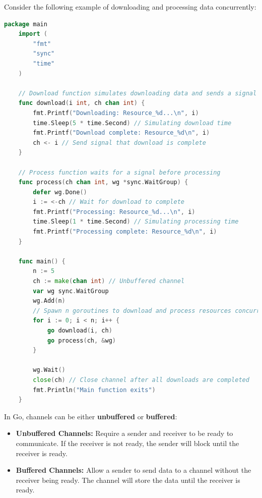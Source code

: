 \begin{Example}

    \label{ex:channels}
Consider the following example of downloading and processing data concurrently:
\begin{lstlisting}[language=Go, caption=Using Channels to Synchronize Downloading and Processing, label={lst:channels}, numbers=none]
    package main
    import (
        "fmt"
        "sync"
        "time"
    )

    // Download function simulates downloading data and sends a signal when done
    func download(i int, ch chan int) {
        fmt.Printf("Downloading: Resource_%d...\n", i)
        time.Sleep(5 * time.Second) // Simulating download time
        fmt.Printf("Download complete: Resource_%d\n", i)
        ch <- i // Send signal that download is complete
    }

    // Process function waits for a signal before processing
    func process(ch chan int, wg *sync.WaitGroup) {
        defer wg.Done()
        i := <-ch // Wait for download to complete
        fmt.Printf("Processing: Resource_%d...\n", i)
        time.Sleep(1 * time.Second) // Simulating processing time
        fmt.Printf("Processing complete: Resource_%d\n", i)
    }

    func main() {
        n := 5
        ch := make(chan int) // Unbuffered channel
        var wg sync.WaitGroup
        wg.Add(n)
        // Spawn n goroutines to download and process resources concurrently
        for i := 0; i < n; i++ {
            go download(i, ch)
            go process(ch, &wg)
        }

        wg.Wait()
        close(ch) // Close channel after all downloads are completed
        fmt.Println("Main function exits")
    }

    \end{lstlisting}
\end{Example}

\newpage 

\begin{theo}

    In Go, channels can be either \textbf{unbuffered} or \textbf{buffered}:
    \begin{itemize}
        \item \textbf{Unbuffered Channels:} Require a sender and receiver to be ready to communicate. If the receiver is not ready, the sender will block until the receiver is ready.
        \item \textbf{Buffered Channels:} Allow a sender to send data to a channel without the receiver being ready. The channel will store the data until the receiver is ready.
    \end{itemize}
\end{theo}

